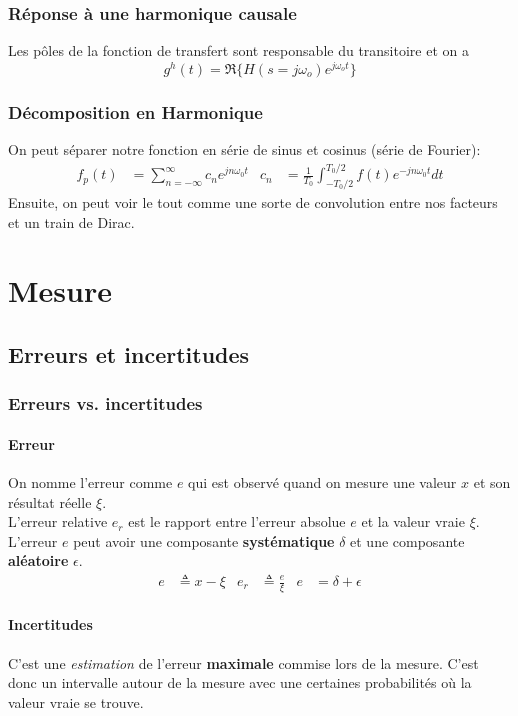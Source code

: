 \documentclass{report}
\begin{document}
\subsection{Réponse à une harmonique causale}
Les pôles de la fonction de transfert sont responsable du transitoire et on a
\begin{equation}
g^h (t) = \mathfrak{R} \{H(s = j \omega_o) e^{j \omega_o t}\}
\end{equation}

\subsection{Décomposition en Harmonique}
On peut séparer notre fonction en série de sinus et cosinus (série de Fourier):
\begin{align*}
f_p (t) &= \sum_{n = - \infty}^{\infty} c_n e^{j n \omega_0 t} & c_n &= \frac{1}{T_0} \int_{- T_0 / 2}^{T_0 / 2} f(t) e^{-j n \omega_0 t} dt
\end{align*}
Ensuite, on peut voir le tout comme une sorte de convolution entre nos facteurs et un train de Dirac.


\chapter{Mesure}
\section{Erreurs et incertitudes}
\subsection{Erreurs vs. incertitudes}
\subsubsection{Erreur}
On nomme l'erreur comme $e$ qui est observé quand on mesure une valeur $x$ et son résultat réelle $\xi$.\\
L'erreur relative $e_r$ est le rapport entre l'erreur absolue $e$ et la valeur vraie $\xi$.\\ 
L'erreur $e$ peut avoir une composante \textbf{systématique} $\delta$ et une composante \textbf{aléatoire} $\epsilon$.
\begin{align*}
e &\triangleq  x - \xi & e_r &\triangleq \frac{e}{\xi} & e &= \delta + \epsilon 
\end{align*}

\subsubsection{Incertitudes}
C'est une \textit{estimation} de l'erreur \textbf{maximale} commise lors de la mesure. C'est donc un intervalle autour de la mesure avec une certaines probabilités où la valeur vraie se trouve. 
\end{document}
